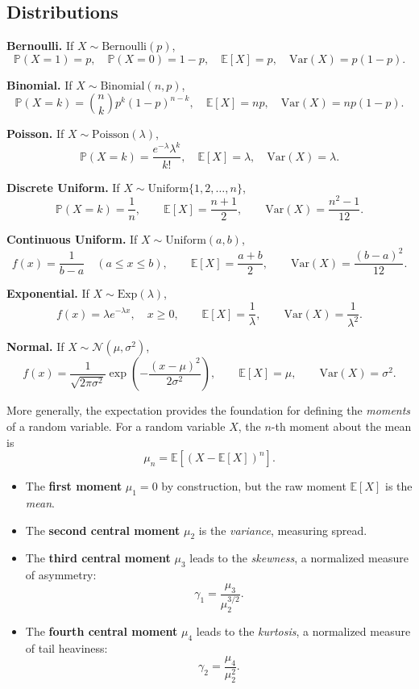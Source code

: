 \documentclass{book}
\begin{document}
\medskip

\subsection*{Distributions}

\textbf{Bernoulli.} If $X \sim \text{Bernoulli}(p)$,
\[
\mathbb{P}(X=1)=p, \quad \mathbb{P}(X=0)=1-p, \quad 
\mathbb{E}[X] = p, \quad \mathrm{Var}(X) = p(1-p).
\]

\medskip

\textbf{Binomial.} If $X \sim \text{Binomial}(n, p)$,
\[
\mathbb{P}(X=k)=\binom{n}{k} p^k (1-p)^{n-k}, \quad 
\mathbb{E}[X] = np, \quad \mathrm{Var}(X)=np(1-p).
\]

\medskip

\textbf{Poisson.} If $X \sim \text{Poisson}(\lambda)$,
\[
\mathbb{P}(X=k)=\frac{e^{-\lambda}\lambda^k}{k!}, \quad 
\mathbb{E}[X]=\lambda, \quad \mathrm{Var}(X)=\lambda.
\]

\medskip

\textbf{Discrete Uniform.} If $X \sim \text{Uniform}\{1,2,\ldots,n\}$,
\[
\mathbb{P}(X=k)=\frac{1}{n}, \qquad
\mathbb{E}[X]=\frac{n+1}{2}, \qquad
\mathrm{Var}(X)=\frac{n^2-1}{12}.
\]

\medskip

\textbf{Continuous Uniform.} If $X \sim \text{Uniform}(a,b)$,
\[
f(x) = \frac{1}{b-a} \quad (a \leq x \leq b), \qquad
\mathbb{E}[X] = \frac{a+b}{2}, \qquad
\mathrm{Var}(X)=\frac{(b-a)^2}{12}.
\]

\medskip

\textbf{Exponential.} If $X \sim \text{Exp}(\lambda)$,
\[
f(x) = \lambda e^{-\lambda x}, \quad x \geq 0, \qquad 
\mathbb{E}[X]=\frac{1}{\lambda}, \qquad
\mathrm{Var}(X)=\frac{1}{\lambda^2}.
\]

\medskip

\textbf{Normal.} If $X \sim \mathcal{N}(\mu,\sigma^2)$,
\[
f(x) = \frac{1}{\sqrt{2\pi\sigma^2}} \exp\!\left( -\frac{(x-\mu)^2}{2\sigma^2} \right), \qquad
\mathbb{E}[X]=\mu, \qquad
\mathrm{Var}(X)=\sigma^2.
\]

\medskip

More generally, the expectation provides the foundation for defining the \emph{moments} of a random variable. 
For a random variable $X$, the $n$-th moment about the mean is
\[
\mu_n = \mathbb{E}\!\left[(X - \mathbb{E}[X])^n\right].
\]

\begin{itemize}
    \item The \textbf{first moment} $\mu_1 = 0$ by construction, but the raw moment $\mathbb{E}[X]$ is the \emph{mean}.
    \item The \textbf{second central moment} $\mu_2$ is the \emph{variance}, measuring spread.
    \item The \textbf{third central moment} $\mu_3$ leads to the \emph{skewness}, a normalized measure of asymmetry:
    \[
    \gamma_1 = \frac{\mu_3}{\mu_2^{3/2}}.
    \]
    \item The \textbf{fourth central moment} $\mu_4$ leads to the \emph{kurtosis}, a normalized measure of tail heaviness:
    \[
    \gamma_2 = \frac{\mu_4}{\mu_2^{2}}.
    \]
\end{itemize}
\end{document}
